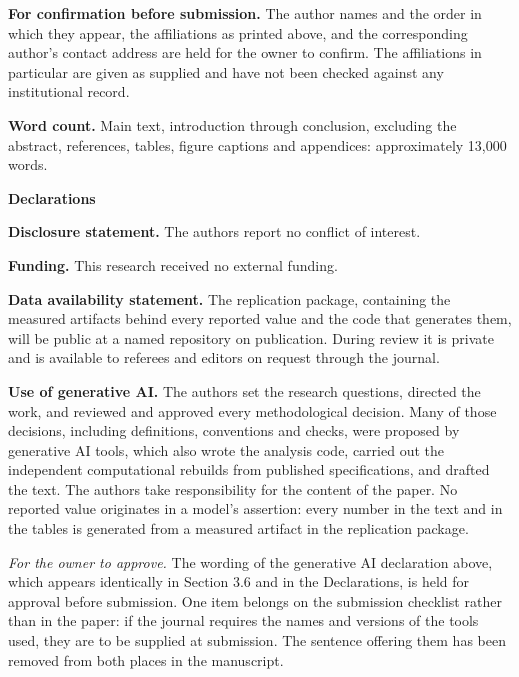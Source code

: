 \documentclass[11pt]{article}
\begin{document}
\vspace{0.5em}

\noindent\textbf{For confirmation before submission.} The author names and the order in which
they appear, the affiliations as printed above, and the corresponding author's contact address are
held for the owner to confirm. The affiliations in particular are given as supplied and have not
been checked against any institutional record.

\vspace{1.5em}

\noindent\textbf{Word count.} Main text, introduction through conclusion, excluding the
abstract, references, tables, figure captions and appendices: approximately 13,000 words.

\vspace{1.5em}

\noindent\textbf{Declarations}

\vspace{0.5em}

\noindent\textbf{Disclosure statement.} The authors report no conflict of interest.

\vspace{0.5em}

\noindent\textbf{Funding.} This research received no external funding.

\vspace{0.5em}

\noindent\textbf{Data availability statement.} The replication package, containing the measured
artifacts behind every reported value and the code that generates them, will be public at a named
repository on publication. During review it is private and is available to referees and editors on
request through the journal.

\vspace{0.5em}

\noindent\textbf{Use of generative AI.} The authors set the research questions, directed the work, and reviewed and approved every
methodological decision. Many of those decisions, including definitions, conventions and checks,
were proposed by generative AI tools, which also wrote the analysis code, carried out the
independent computational rebuilds from published specifications, and drafted the text. The
authors take responsibility for the content of the paper. No reported value originates in a
model's assertion: every number in the text and in the tables is generated from a measured
artifact in the replication package.

\vspace{0.5em}

\noindent\textit{For the owner to approve.} The wording of the generative AI declaration above,
which appears identically in Section 3.6 and in the Declarations, is held for approval before
submission. One item belongs on the submission checklist rather than in the paper: if the journal
requires the names and versions of the tools used, they are to be supplied at submission. The
sentence offering them has been removed from both places in the manuscript.
\end{document}
